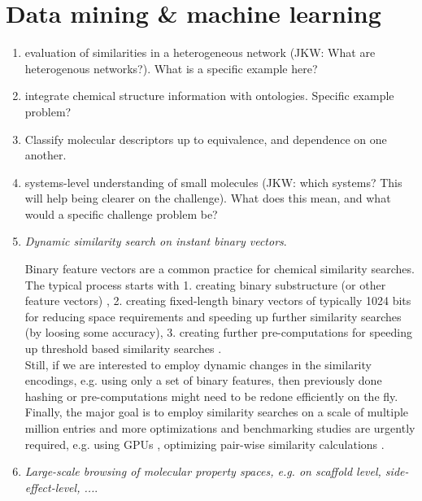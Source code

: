 \documentclass{sig-alternate}
\begin{document}
\section*{Data mining \& machine learning}
\begin{enumerate}
\item evaluation of similarities in a heterogeneous network (JKW: What are heterogenous networks?).  What is a specific example here?
\item integrate chemical structure information with ontologies.  Specific example problem?
\item Classify molecular descriptors up to equivalence, and dependence on one another.
\item systems-level understanding of small molecules (JKW: which systems? This will help being clearer on the challenge).  What does this mean, and what would a specific challenge problem be?
%
%
\item \emph{Dynamic similarity search on instant binary vectors}.

  Binary feature vectors are a common practice for chemical similarity
  searches. The typical process starts with 1. creating binary
  substructure (or other feature vectors) \cite{citeulike:8530538},
  2. creating fixed-length binary vectors of typically 1024 bits for
  reducing space requirements and speeding up further similarity
  searches (by loosing some accuracy), 3. creating further
  pre-computations for speeding up threshold based similarity searches
  \cite{doi:10.1021/ci800076s}.\\  Still, if we are interested to employ
  dynamic changes in the similarity encodings, e.g. using only a set
  of binary features, then previously done hashing or pre-computations
  might need to be redone efficiently on the fly. Finally, the major
  goal is to employ similarity searches \cite{doi:10.1021/ci200235e}
  on a scale of multiple million entries and more optimizations and
  benchmarking studies are urgently required, e.g. using GPUs
  \cite{doi:10.1021/ci1004948}, optimizing pair-wise similarity
  calculations \cite{MINF:MINF201100050}.
%

\item \emph{Large-scale browsing of molecular property spaces, e.g. on scaffold level, side-effect-level, ...}.


\end{enumerate}
\end{document}
